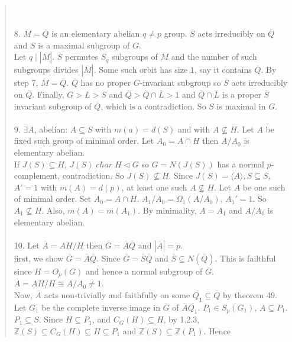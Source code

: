 \begin{quote}
\\
\\
8. ${\overline M} = {\overline Q}$ is an elementary abelian $q \neq p$ group.  ${\overline S}$
acts irreducibly on ${\overline Q}$ and $S$ is a maximal subgroup of $G$.
\\
Let $q \mid |{\overline M}|$.  ${\overline S}$ permutes $S_q$ subgroups of ${\overline M}$ and the
number of such subgroups divides $|{\overline M}|$.  Some such orbit has size $1$, say it contains
${\overline Q}$.  By step 7, ${\overline M} = {\overline Q}$.
${\overline Q}$ has no proper $G$-invariant
subgroup so ${\overline S}$ acts irreducibly on ${\overline Q}$.  Finally, $G > L >S$ and
${\overline Q} > {\overline Q} \cap {\overline L} > 1$ and ${\overline Q} \cap {\overline L}$ is
a proper ${\overline S}$ invariant subgroup of ${\overline Q}$, which is a contradiction.  So
$S$ is maximal in $G$.
\\
\\
9. $\exists A$, abelian: $A \subseteq S$ with $m(a) = d(S)$ and with $A \nsubseteq H$.  Let $A$ be
fixed such group of minimal order.  Let $A_0 = A \cap H$ then $A/A_0$ is elementary abelian.
\\
If $J(S) \subseteq H$, $J(S) \; char \; H \lhd G$ so $G = N(J(S))$
has a normal $p$-complement, contradiction.
So $J(S) \nsubseteq H$.  Since $J(S) = \langle A \rangle, S \subseteq S$, $A' =1$ with $m(A)=d(p)$,
at least one such $A \nsubseteq H$.  Let $A$ be one such of minimal order.  Set $A_0 = A \cap H$.  $A_1/A_0 = \Omega_1(A/A_0)$,
$A_1'=1$.  So $A_1 \nsubseteq H$. Also, $m(A)= m(A_1)$.
By minimality, $A = A_1$ and $A/A_0$ is elementary abelian.
\\
\\
10. Let ${\overline A} = AH/H$ then ${\overline G} = {\overline A} {\overline Q}$ and $|{\overline A}| = p$.
\\
first, we show ${\overline G} = {\overline A} {\overline Q}$.
Since ${\overline G} = {\overline S} {\overline Q}$ and
${\overline S} \subseteq N({\overline Q})$.  This is failthful since $H = O_p(G)$ and hence a normal subgroup
of ${\overline G}$.  ${\overline A} = AH/H \cong A/A_0 \neq 1$.
\\
Now, ${\overline A}$ acts non-trivially and faithfully on some
${\overline {Q_1}} \subseteq {\overline Q}$ by theorem 49. Let $G_1$ be the complete inverse image in ${\overline G}$ of ${\overline A} {\overline {Q_1}}$.
$P_1 \in S_p(G_1)$, $A \subseteq P_1$. $P_1 \subseteq S$.  Since $H \subseteq P_1$, and $C_G(H) \subseteq H$, by
1.2.3, ${\mathbb Z}(S) \subseteq C_G(H) \subseteq H \subseteq P_1$ and ${\mathbb Z}(S) \subseteq {\mathbb Z}(P_1)$.  Hence

\end{quote}
